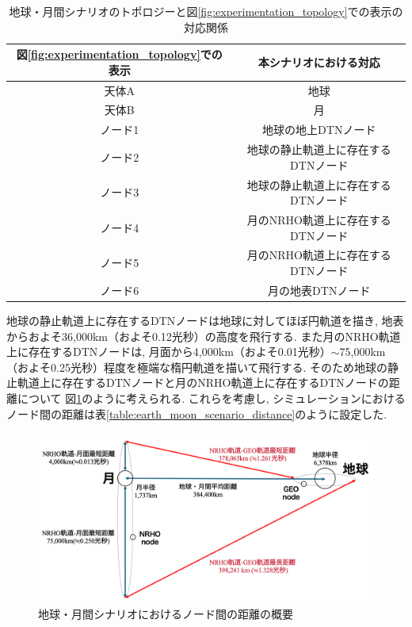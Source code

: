 \begin{table}[htbp]
    \centering
    \caption{地球・月間シナリオのトポロジーと図\ref{fig:experimentation_topology}での表示の対応関係}
    \begin{tabular}{cc}  \hline
        図\ref{fig:experimentation_topology}での表示 & 本シナリオにおける対応 \\ \hline
        天体A & 地球 \\
        天体B & 月 \\
        ノード1 & 地球の地上DTNノード \\
        ノード2 & 地球の静止軌道上に存在するDTNノード \\
        ノード3 & 地球の静止軌道上に存在するDTNノード \\
        ノード4 & 月のNRHO軌道上に存在するDTNノード \\
        ノード5 & 月のNRHO軌道上に存在するDTNノード \\
        ノード6 & 月の地表DTNノード \\ \hline
    \end{tabular}
    \label{table:earth_moon_scenario_topology}
\end{table}

地球の静止軌道上に存在するDTNノードは地球に対してほぼ円軌道を描き, 
地表からおよそ36,000km（およそ0.12光秒）の高度を飛行する. 
また月のNRHO軌道上に存在するDTNノードは,  
月面から4,000km（およそ0.01光秒）$\sim$75,000km（およそ0.25光秒）程度を極端な楕円軌道を描いて飛行する. 
そのため地球の静止軌道上に存在するDTNノードと月のNRHO軌道上に存在するDTNノードの距離について
図\ref{fig:distance_earth_moon}のように考えられる. 
これらを考慮し, シミュレーションにおけるノード間の距離は表\ref{table:earth_moon_scenario_distance}のように設定した. 
\begin{figure}[tbh]
    \centering
    \includegraphics[width=0.7\textheight]{img/simulation_params_earth_moon.pdf}
    \caption{地球・月間シナリオにおけるノード間の距離の概要}
    \label{fig:distance_earth_moon}
\end{figure}

